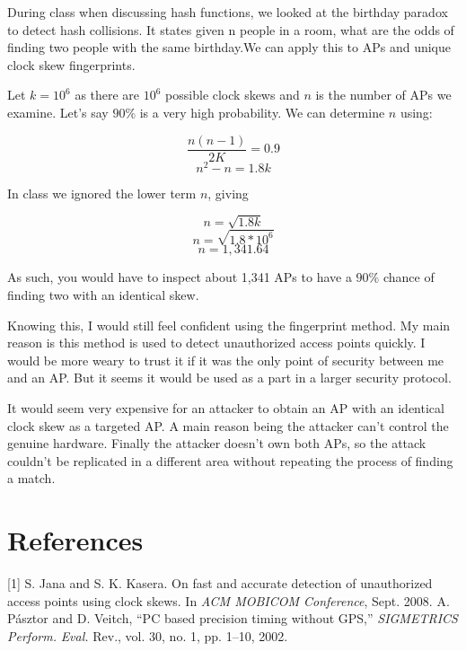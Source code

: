 \documentclass[11pt]{article}
\begin{document}
During class when discussing hash functions, we looked at the birthday paradox to detect hash collisions. It states given n people in a room, what are the odds of finding two people with the same birthday.We can apply this to APs and unique clock skew fingerprints.

Let $k = 10^6$ as there are $10^6$ possible clock skews and $n$ is the number of APs we examine. Let's say $90\%$ is a very high probability. We can determine $n$ using:

$$\frac{n(n-1)}{2K} = 0.9$$
$$n^2 - n = 1.8k$$

In class we ignored the lower term $n$, giving

$$n = \sqrt{1.8k}$$
$$n = \sqrt{1.8 * 10^6}$$
$$n = 1,341.64$$

As such, you would have to inspect about 1,341 APs to have a $90\%$ chance of finding two with an identical skew.

Knowing this, I would still feel confident using the fingerprint method. My main reason is this method is used to detect unauthorized access points quickly. I would be more weary to trust it if it was the only point of security between me and an AP. But it seems it would be used as a part in a larger security protocol. 

It would seem very expensive for an attacker to obtain an AP with an identical clock skew as a targeted AP. A main reason being the attacker can't control the genuine hardware. Finally the attacker doesn't own both APs, so the attack couldn't be replicated in a different area without repeating the process of finding a match.


\section*{References}
[1]  S. Jana and S. K. Kasera. On fast and accurate detection of
unauthorized access points using \hspace*{1em} clock skews. In \textit{ACM
MOBICOM Conference}, Sept. 2008.
\newline \newline
[2]  A. Pásztor and D. Veitch, “PC based precision timing without GPS,”
\textit{SIGMETRICS Perform.} \hspace*{1em} \textit{Eval.} Rev., vol. 30, no. 1, pp. 1–10, 2002.
\end{document}
